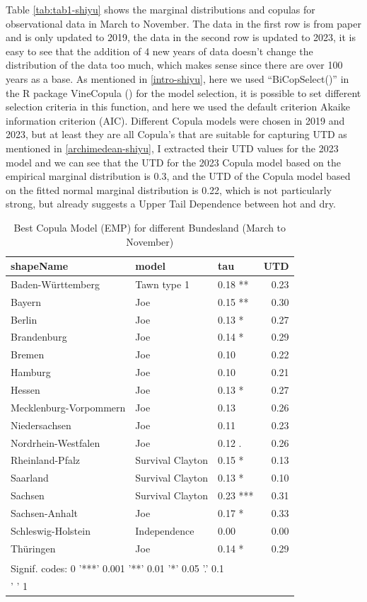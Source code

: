 \documentclass[
]{krantz}
\begin{document}
Table \ref{tab:tab1-shiyu} shows the marginal distributions and copulas for observational data in March to November. The data in the first row is from paper and is only updated to 2019, the data in the second row is updated to 2023, it is easy to see that the addition of 4 new years of data doesn't change the distribution of the data too much, which makes sense since there are over 100 years as a base. As mentioned in \ref{intro-shiyu}, here we used ``BiCopSelect()'' in the R package VineCopula (\citet{schepsmeier2018}) for the model selection, it is possible to set different selection criteria in this function, and here we used the default criterion Akaike information criterion (AIC). Different Copula models were chosen in 2019 and 2023, but at least they are all Copula's that are suitable for capturing UTD as mentioned in \ref{archimedean-shiyu}, I extracted their UTD values for the 2023 model and we can see that the UTD for the 2023 Copula model based on the empirical marginal distribution is 0.3, and the UTD of the Copula model based on the fitted normal marginal distribution is 0.22, which is not particularly strong, but already suggests a Upper Tail Dependence between hot and dry.

\begin{table}

\caption{\label{tab:tab2-shiyu}Best Copula Model (EMP) for different Bundesland (March to November)}
\centering
\begin{tabular}[t]{l|l|l|r}
\hline
shapeName & model & tau & UTD\\
\hline
Baden-Württemberg & Tawn type 1 & 0.18 ** & 0.23\\
\hline
Bayern & Joe & 0.15 ** & 0.30\\
\hline
Berlin & Joe & 0.13 * & 0.27\\
\hline
Brandenburg & Joe & 0.14 * & 0.29\\
\hline
Bremen & Joe & 0.10 & 0.22\\
\hline
Hamburg & Joe & 0.10 & 0.21\\
\hline
Hessen & Joe & 0.13 * & 0.27\\
\hline
Mecklenburg-Vorpommern & Joe & 0.13 & 0.26\\
\hline
Niedersachsen & Joe & 0.11 & 0.23\\
\hline
Nordrhein-Westfalen & Joe & 0.12 . & 0.26\\
\hline
Rheinland-Pfalz & Survival Clayton & 0.15 * & 0.13\\
\hline
Saarland & Survival Clayton & 0.13 * & 0.10\\
\hline
Sachsen & Survival Clayton & 0.23 *** & 0.31\\
\hline
Sachsen-Anhalt & Joe & 0.17 * & 0.33\\
\hline
Schleswig-Holstein & Independence & 0.00 & 0.00\\
\hline
Thüringen & Joe & 0.14 * & 0.29\\
\hline
\multicolumn{4}{l}{\textsuperscript{} Signif. codes: 0 '***' 0.001 '**' 0.01 '*' 0.05 '.' 0.1}\\
\multicolumn{4}{l}{' ' 1}\\
\end{tabular}
\end{table}
\end{document}
